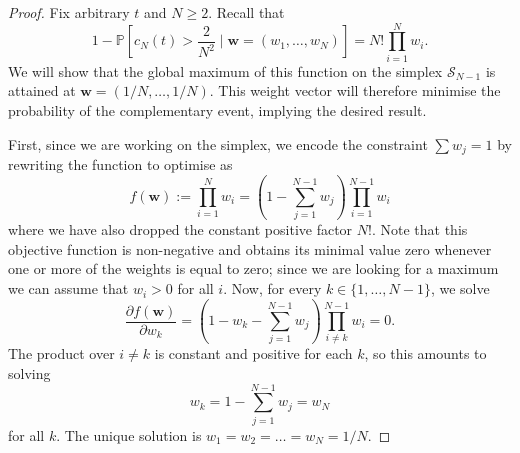 \documentclass{article}
\newcommand{\PR}{\mathbb{P}}
\newcommand{\1}[1]{\mathbb{I}_{#1}}
\begin{document}
\begin{proof}
Fix arbitrary $t$ and $N\geq 2$. Recall that
\begin{equation}\label{eq:mn_nomerger_prob}
1-\PR \left[c_N(t) > \frac{2}{N^2} \mid \mathbf{w}=(w_1, \dots, w_N) \right]
= N! \prod_{i=1}^N w_i .
\end{equation}
We will show that the global maximum of this function on the simplex $\mathcal{S}_{N-1}$ is attained at $\mathbf{w}=(1/N,\dots,1/N)$.
This weight vector will therefore minimise the probability of the complementary event, implying the desired result.

First, since we are working on the simplex, we encode the constraint $\sum w_j =1$ by rewriting the function to optimise as
\begin{equation*}
f(\mathbf{w}) :=
\prod_{i=1}^N w_i
= \left(1- \sum_{j=1}^{N-1} w_j \right)\prod_{i=1}^{N-1} w_i 
\end{equation*}
where we have also dropped the constant positive factor $N!$. Note that this objective function is non-negative and obtains its minimal value zero whenever one or more of the weights is equal to zero; since we are looking for a maximum we can assume that $w_i >0$ for all $i$.
Now, for every $k \in \{1,\dots,N-1\}$, we solve
\begin{equation*}
\frac{\partial f(\mathbf{w})}{\partial w_k}
= \left(1- w_k - \sum_{j=1}^{N-1} w_j \right)\prod_{i\neq k}^{N-1} w_i 
=0 .
\end{equation*}
The product over $i \neq k$ is constant and positive for each $k$, so this amounts to solving
\begin{equation*}
w_k = 1- \sum_{j=1}^{N-1} w_j = w_N
\end{equation*}
for all $k$.
The unique solution is
$w_1 = w_2= \dots =  w_N = 1/N$.


\end{proof}
\end{document}
